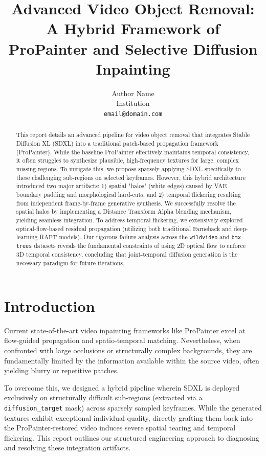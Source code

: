 \documentclass[10pt,twocolumn,letterpaper]{article}
\title{Advanced Video Object Removal: A Hybrid Framework of ProPainter and Selective Diffusion Inpainting}
\author{
Author Name\\
Institution\\
{\tt\small email@domain.com}
}
\begin{document}
\maketitle

\begin{abstract}
This report details an advanced pipeline for video object removal that integrates Stable Diffusion XL (SDXL) into a traditional patch-based propagation framework (ProPainter). While the baseline ProPainter effectively maintains temporal consistency, it often struggles to synthesize plausible, high-frequency textures for large, complex missing regions. To mitigate this, we propose sparsely applying SDXL specifically to these challenging sub-regions on selected keyframes. However, this hybrid architecture introduced two major artifacts: 1) spatial "halos" (white edges) caused by VAE boundary padding and morphological hard-cuts, and 2) temporal flickering resulting from independent frame-by-frame generative synthesis. We successfully resolve the spatial halos by implementing a Distance Transform Alpha blending mechanism, yielding seamless integration. To address temporal flickering, we extensively explored optical-flow-based residual propagation (utilizing both traditional Farneback and deep-learning RAFT models). Our rigorous failure analysis across the \verb|wildvideo| and \verb|bmx-trees| datasets reveals the fundamental constraints of using 2D optical flow to enforce 3D temporal consistency, concluding that joint-temporal diffusion generation is the necessary paradigm for future iterations.
\end{abstract}

\section{Introduction}
Current state-of-the-art video inpainting frameworks like ProPainter excel at flow-guided propagation and spatio-temporal matching. Nevertheless, when confronted with large occlusions or structurally complex backgrounds, they are fundamentally limited by the information available within the source video, often yielding blurry or repetitive patches.

To overcome this, we designed a hybrid pipeline wherein SDXL is deployed exclusively on structurally difficult sub-regions (extracted via a \verb|diffusion_target| mask) across sparsely sampled keyframes. While the generated textures exhibit exceptional individual quality, directly grafting them back into the ProPainter-restored video induces severe spatial tearing and temporal flickering. This report outlines our structured engineering approach to diagnosing and resolving these integration artifacts.
\end{document}
